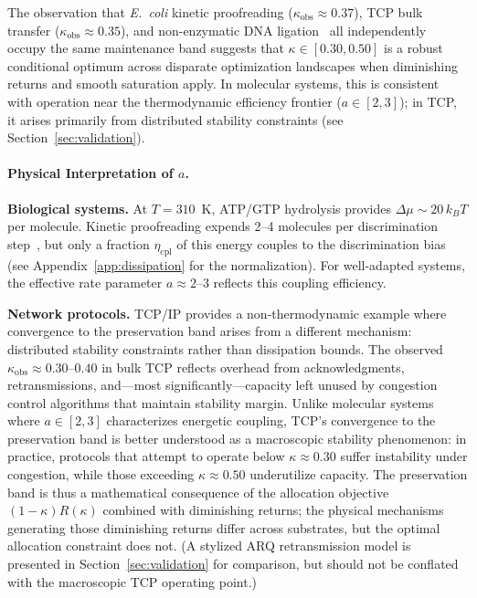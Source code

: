 \documentclass[11pt,twocolumn]{article}
\begin{document}
The observation that \textit{E.~coli} kinetic proofreading ($\kappa_{\mathrm{obs}} \approx 0.37$), TCP bulk transfer ($\kappa_{\mathrm{obs}} \approx 0.35$), and non-enzymatic DNA ligation~\cite{Aoyanagi2025} all independently occupy the same maintenance band suggests that $\kappa \in [0.30, 0.50]$ is a robust conditional optimum across disparate optimization landscapes when diminishing returns and smooth saturation apply. In molecular systems, this is consistent with operation near the thermodynamic efficiency frontier ($a \in [2,3]$); in TCP, it arises primarily from distributed stability constraints (see Section~\ref{sec:validation}).

\paragraph{Physical Interpretation of $a$.}

\textbf{Biological systems.} At $T = 310$~K, ATP/GTP hydrolysis provides $\Delta\mu \sim 20\, k_B T$ per molecule. Kinetic proofreading expends 2--4 molecules per discrimination step~\cite{Hopfield1974,Johansson2012}, but only a fraction $\eta_{\mathrm{cpl}}$ of this energy couples to the discrimination bias (see Appendix~\ref{app:dissipation} for the normalization). For well-adapted systems, the effective rate parameter $a \approx 2$--$3$ reflects this coupling efficiency.

\textbf{Network protocols.} TCP/IP provides a non-thermodynamic example where convergence to the preservation band arises from a different mechanism: distributed stability constraints rather than dissipation bounds. The observed $\kappa_{\mathrm{obs}} \approx 0.30$--$0.40$ in bulk TCP reflects overhead from acknowledgments, retransmissions, and---most significantly---capacity left unused by congestion control algorithms that maintain stability margin. Unlike molecular systems where $a \in [2,3]$ characterizes energetic coupling, TCP's convergence to the preservation band is better understood as a macroscopic stability phenomenon: in practice, protocols that attempt to operate below $\kappa \approx 0.30$ suffer instability under congestion, while those exceeding $\kappa \approx 0.50$ underutilize capacity. The preservation band is thus a mathematical consequence of the allocation objective $(1-\kappa)R(\kappa)$ combined with diminishing returns; the physical mechanisms generating those diminishing returns differ across substrates, but the optimal allocation constraint does not. (A stylized ARQ retransmission model is presented in Section~\ref{sec:validation} for comparison, but should not be conflated with the macroscopic TCP operating point.)
\end{document}
